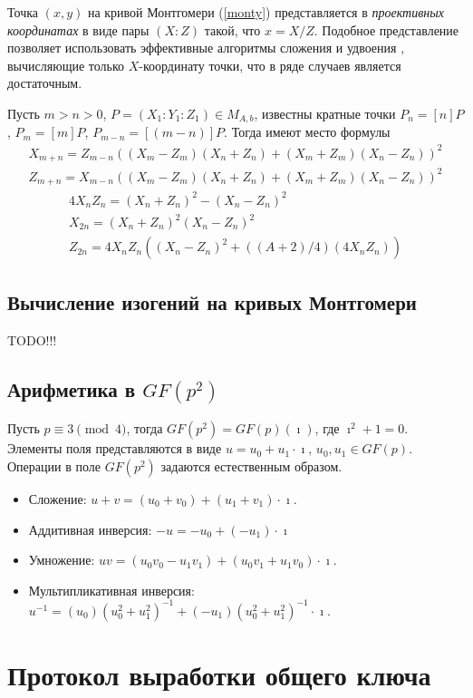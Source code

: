 \documentclass[a4paper,12pt]{article}
\theoremstyle{definition}
\begin{document}
Точка $(x,y)$ на кривой Монтгомери (\ref{monty}) представляется в \emph{проективных координатах} в виде пары $(X:Z)$ такой, что $x=X/Z$.
Подобное представление позволяет использовать эффективные алгоритмы сложения и удвоения \cite{EFD,Mon}, вычисляющие только $X$-координату точки, 
что в ряде случаев %
является достаточным.

Пусть $m>n>0$, $P=(X_1:Y_1:Z_1)\in M_{A,b}$, известны кратные точки $P_{n}=[n]P$, $P_{m}=[m]P$, $P_{m-n}=[(m-n)]P$. Тогда имеют место формулы
\begin{eqnarray*}
X_{m+n}=Z_{m-n}((X_m-Z_m)(X_n+Z_n)+(X_m+Z_m)(X_n-Z_n))^2\\
Z_{m+n}=X_{m-n}((X_m-Z_m)(X_n+Z_n)+(X_m+Z_m)(X_n-Z_n))^2
\end{eqnarray*}
\begin{eqnarray*}
4X_nZ_n=(X_n+Z_n)^2-(X_n-Z_n)^2\\
X_{2n}=(X_n+Z_n)^2(X_n-Z_n)^2\\
Z_{2n}=4X_nZ_n((X_n-Z_n)^2+((A+2)/4)(4X_nZ_n))
\end{eqnarray*}

\subsection{Вычисление изогений на кривых Монтгомери}

TODO!!!

\subsection{Арифметика в $GF(p^2)$}

Пусть $p\equiv 3\pmod{4}$, тогда $GF(p^2) = GF(p)(\imath)$, где $\imath^2+1=0$.
Элементы поля представляются в виде $u=u_0+u_1\cdot\imath$, $u_0, u_1\in GF(p)$.
Операции в поле $GF(p^2)$ задаются естественным образом.
\begin{itemize}
 \item Сложение: $u+v = (u_0+v_0) + (u_1+v_1)\cdot\imath$.
 \item Аддитивная инверсия: $-u=-u_0+(-u_1)\cdot\imath$
 \item Умножение: $uv = (u_0v_0-u_1v_1) + (u_0v_1+u_1v_0)\cdot\imath$.
 \item Мультипликативная инверсия: $u^{-1} = (u_0)(u_0^2+u_1^2)^{-1} + (-u_1)(u_0^2+u_1^2)^{-1}\cdot\imath   $.
\end{itemize}




\section{Протокол выработки общего ключа}\label{protodesc}
\end{document}

